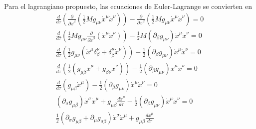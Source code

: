 Para el lagrangiano propuesto, las ecuaciones de Euler-Lagrange se convierten en
\begin{equation}
    \begin{aligned}
        \frac{d}{d\tau} \left( \frac{\partial }{\partial \dot{x}^\beta} \left(\frac{1}{2} M g_{\mu \nu} \dot{x}^\mu \dot{x}^\nu \right) \right) - \frac{\partial }{\partial x^\beta}\left(\frac{1}{2} M g_{\mu \nu} \dot{x}^\mu \dot{x}^\nu \right) = 0 \\
        \frac{d}{d\tau} \left( \frac{1}{2} M g_{\mu \nu} \frac{\partial }{\partial \dot{x}^\beta} \left(  \dot{x}^\mu \dot{x}^\nu \right) \right)
        - \frac{1}{2} M \left( \partial_\beta g_{\mu \nu} \right) \dot{x}^\mu \dot{x}^\nu = 0                                                                                                                                                           \\
        \frac{d}{d\tau} \left( \frac{1}{2}  g_{\mu \nu}  \left(  \dot{x}^\mu \delta_\beta^\nu +\delta_\beta^\mu \dot{x}^\nu \right) \right)
        - \frac{1}{2}  \left( \partial_\beta g_{\mu \nu} \right) \dot{x}^\mu \dot{x}^\nu = 0                                                                                                                                                            \\
        \frac{d}{d\tau} \left( \frac{1}{2}   \left(  g_{\mu \beta} \dot{x}^\mu  + g_{\beta \nu}  \dot{x}^\nu \right) \right)
        - \frac{1}{2}  \left( \partial_\beta g_{\mu \nu} \right) \dot{x}^\mu \dot{x}^\nu = 0                                                                                                                                                            \\
        \frac{d}{d\tau} \left(    g_{\mu \beta} \dot{x}^\mu \right)
        - \frac{1}{2}  \left( \partial_\beta g_{\mu \nu} \right) \dot{x}^\mu \dot{x}^\nu = 0                                                                                                                                                            \\
        \left(\partial_\sigma g_{\mu \beta }\right) \dot{x}^\sigma \dot{x}^\mu+    g_{\mu \beta} \frac{d \dot{x}^\mu}{d\tau}
        - \frac{1}{2}  \left( \partial_\beta g_{\mu \nu} \right) \dot{x}^\mu \dot{x}^\nu = 0                                                                                                                                                            \\
        \frac{1}{2}\left(\partial_\sigma g_{\mu \beta } + \partial_\mu g_{\sigma \beta } \right) \dot{x}^\sigma \dot{x}^\mu+    g_{\mu \beta} \frac{d \dot{x}^\mu}{d\tau}

\end{aligned}
\end{equation}
